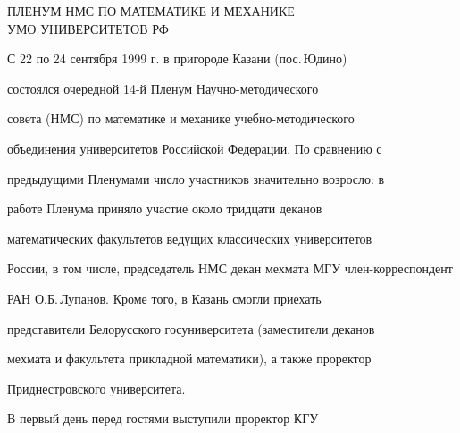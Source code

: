 




\pagestyle{empty}





\vskip 3cm





\begin{center}


ПЛЕНУМ НМС ПО МАТЕМАТИКЕ И МЕХАНИКЕ \\


УМО УНИВЕРСИТЕТОВ РФ


\end{center}


\bigskip





С 22 по 24 сентября 1999 г. в пригороде Казани (пос.\,Юдино)


состоялся очередной 14-й Пленум Научно-методического 


совета (НМС) по математике и механике учебно-методического 


объединения университетов Российской Федерации. По сравнению с 


предыдущими Пленумами число участников значительно возросло: в 


работе Пленума приняло участие около тридцати деканов 


математических факультетов ведущих классических университетов 


России, в том числе, председатель НМС декан мехмата МГУ член-корреспондент


РАН О.Б.\,Лупанов. Кроме того, в Казань смогли приехать 


представители Белорусского госуниверситета (заместители деканов 


мехмата и факультета прикладной математики), а также проректор 


Приднестровского университета.





В первый день перед гостями выступили проректор КГУ 


